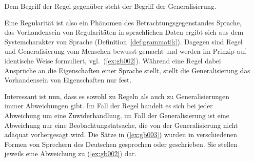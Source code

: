 

Dem Begriff der Regel gegenüber steht der Begriff der Generalisierung.


Eine Regularität ist also ein Phänomen des Betrachtungsgegenstandes Sprache, das Vorhandensein von Regularitäten in sprachlichen Daten ergibt sich aus dem Systemcharakter von Sprache (Definition~\ref{def:grammatik}).
Dagegen sind Regel und Generalisierung vom Menschen bewusst gemacht und werden im Prinzip auf identische Weise formuliert, vgl.\ (\ref{ex:gb002}).
Während eine Regel dabei Ansprüche an die Eigenschaften einer Sprache stellt, stellt die Generalisierung das Vorhandensein von Eigenschaften nur fest.

Interessant ist nun, dass es sowohl zu Regeln als auch zu Generalisierungen immer Abweichungen gibt.
Im Fall der Regel handelt es sich bei jeder Abweichung um eine Zuwiderhandlung, im Fall der Generalisierung ist eine Abweichung nur eine Beobachtungstatsache, die von der Generalisierung nicht adäquat vorhergesagt wird.
Die Sätze in (\ref{ex:gb003}) wurden in verschiedenen Formen von Sprechern des Deutschen gesprochen oder geschrieben.
Sie stellen jeweils eine Abweichung zu (\ref{ex:gb002}) dar.

\begin{exe}
  \ex\label{ex:gb003}
  \begin{xlist}
  \end{xlist}
\end{exe}

